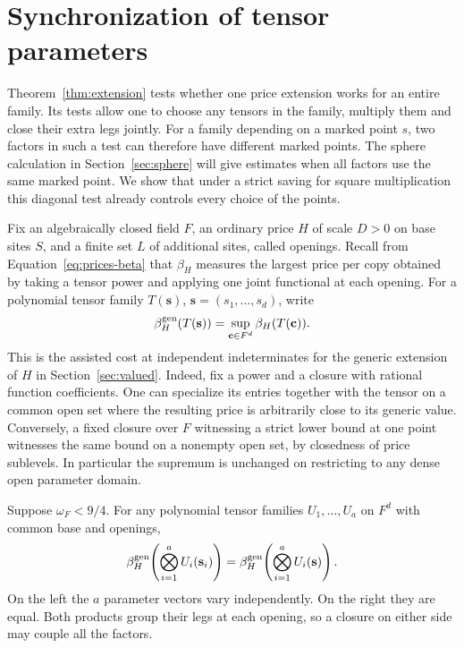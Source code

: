 \section{Synchronization of tensor parameters}\label{sec:sync}

Theorem~\ref{thm:extension} tests whether one price extension works for
an entire family. Its tests allow one to choose any tensors in the family,
multiply them and close their extra legs jointly. For a family depending
on a marked point $s$, two factors in such a test can therefore have
different marked points. The sphere calculation in Section~\ref{sec:sphere}
will give estimates when all factors use the same marked point.
We show that under a strict saving for square multiplication this
diagonal test already controls every choice of the points.

Fix an algebraically closed field $F$, an ordinary price $H$ of scale
$D>0$ on base sites $S$, and a finite set $L$ of additional sites,
called openings. Recall from Equation~\eqref{eq:prices-beta} that
$\beta_H$ measures the largest price per copy obtained by taking a
tensor power and applying one joint functional at each opening.
For a polynomial tensor family $T(\mathbf s)$, $\mathbf s=(s_1,\ldots,s_d)$,
write
\[
 \beta_H^{\rm gen}(T(\mathbf s))
    =\sup_{\mathbf c\in F^d}\beta_H(T(\mathbf c)).
\]
This is the assisted cost at independent indeterminates for the
generic extension of $H$ in Section~\ref{sec:valued}. Indeed, fix a
power and a closure with rational function coefficients. One can
specialize its entries together with the tensor on a common open
set where the resulting price is arbitrarily close to its generic
value. Conversely, a fixed closure over $F$ witnessing a strict lower
bound at one point witnesses the same bound on a nonempty open set,
by closedness of price sublevels. In particular the supremum is unchanged
on restricting to any dense open parameter domain.

\begin{theorem}[Synchronization]\label{thm:sync}
Suppose $\omega_F<9/4$. For any polynomial tensor families
$U_1,\ldots,U_a$ on $F^d$ with common base and openings,
\[
 \beta_H^{\rm gen}\!\left(\bigotimes_{i=1}^a U_i(\mathbf s_i)\right)
 =
 \beta_H^{\rm gen}\!\left(\bigotimes_{i=1}^a U_i(\mathbf s)\right).
\]
On the left the $a$ parameter vectors vary independently. On the right
they are equal. Both products group their legs at each opening, so a
closure on either side may couple all the factors.
\end{theorem}

